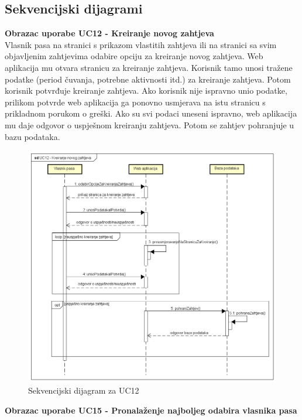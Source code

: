 			\subsection{Sekvencijski dijagrami}
				
				\textbf{Obrazac uporabe UC12 - Kreiranje novog zahtjeva}\\
				
				Vlasnik pasa na stranici s prikazom vlastitih zahtjeva ili na stranici sa svim objavljenim zahtjevima odabire opciju za kreiranje novog zahtjeva. Web aplikacija mu otvara stranicu za kreiranje zahtjeva. Korisnik tamo unosi tražene podatke (period čuvanja, potrebne aktivnosti itd.) za kreiranje zahtjeva. Potom korisnik potvrđuje kreiranje zahtjeva. Ako korisnik nije ispravno unio podatke, prilikom potvrde web aplikacija ga ponovno usmjerava na istu stranicu s prikladnom porukom o greški. Ako su svi podaci uneseni ispravno, web aplikacija mu daje odgovor o uspješnom kreiranju zahtjeva. Potom se zahtjev pohranjuje u bazu podataka.
				
				\begin{figure}[htb]
					\centering
					\includegraphics[width=13cm]{slike/Sekvencijski dijagram - UC12}
					\caption{Sekvencijski dijagram za UC12}
					\label{fig:Sekvencijski-UC12}
				\end{figure}
				\eject		
				
				\textbf{Obrazac uporabe UC15 - Pronalaženje najboljeg odabira vlasnika pasa}\\
				
